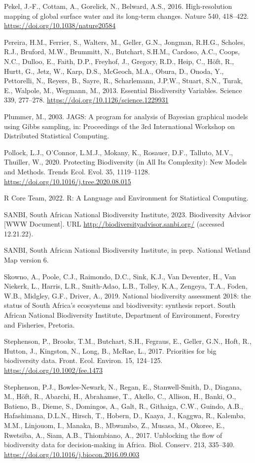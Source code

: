 \documentclass[utf8]{frontiersSCNS}
\begin{document}
Pekel, J.-F., Cottam, A., Gorelick, N., Belward, A.S., 2016.
High-resolution mapping of global surface water and its long-term
changes. Nature 540, 418--422. \url{https://doi.org/10.1038/nature20584}

Pereira, H.M., Ferrier, S., Walters, M., Geller, G.N., Jongman, R.H.G.,
Scholes, R.J., Bruford, M.W., Brummitt, N., Butchart, S.H.M., Cardoso,
A.C., Coops, N.C., Dulloo, E., Faith, D.P., Freyhof, J., Gregory, R.D.,
Heip, C., Höft, R., Hurtt, G., Jetz, W., Karp, D.S., McGeoch, M.A.,
Obura, D., Onoda, Y., Pettorelli, N., Reyers, B., Sayre, R.,
Scharlemann, J.P.W., Stuart, S.N., Turak, E., Walpole, M., Wegmann, M.,
2013. Essential Biodiversity Variables. Science 339, 277--278.
\url{https://doi.org/10.1126/science.1229931}

Plummer, M., 2003. JAGS: A program for analysis of Bayesian graphical
models using Gibbs sampling, in: Proceedings of the 3rd International
Workshop on Distributed Statistical Computing.

Pollock, L.J., O'Connor, L.M.J., Mokany, K., Rosauer, D.F., Talluto,
M.V., Thuiller, W., 2020. Protecting Biodiversity (in All Its
Complexity): New Models and Methods. Trends Ecol. Evol. 35, 1119--1128.
\url{https://doi.org/10.1016/j.tree.2020.08.015}

R Core Team, 2022. R: A Language and Environment for Statistical
Computing.

SANBI, South African National Biodiversity Institute, 2023. Biodiversity
Advisor {[}WWW Document{]}. URL
\url{http://biodiversityadvisor.sanbi.org/} (accessed 12.21.22).

SANBI, South African National Biodiversity Institute, in prep. National
Wetland Map version 6.

Skowno, A., Poole, C.J., Raimondo, D.C., Sink, K.J., Van Deventer, H.,
Van Niekerk, L., Harris, L.R., Smith-Adao, L.B., Tolley, K.A., Zengeya,
T.A., Foden, W.B., Midgley, G.F., Driver, A., 2019. National
biodiversity assessment 2018: the status of South Africa's ecosystems
and biodiversity: synthesis report. South African National Biodiversity
Institute, Department of Environment, Forestry and Fisheries, Pretoria.

Stephenson, P., Brooks, T.M., Butchart, S.H., Fegraus, E., Geller, G.N.,
Hoft, R., Hutton, J., Kingston, N., Long, B., McRae, L., 2017.
Priorities for big biodiversity data. Front. Ecol. Environ. 15,
124--125. \url{https://doi.org/10.1002/fee.1473}

Stephenson, P.J., Bowles-Newark, N., Regan, E., Stanwell-Smith, D.,
Diagana, M., Höft, R., Abarchi, H., Abrahamse, T., Akello, C., Allison,
H., Banki, O., Batieno, B., Dieme, S., Domingos, A., Galt, R., Githaiga,
C.W., Guindo, A.B., Hafashimana, D.L.N., Hirsch, T., Hobern, D., Kaaya,
J., Kaggwa, R., Kalemba, M.M., Linjouom, I., Manaka, B., Mbwambo, Z.,
Musasa, M., Okoree, E., Rwetsiba, A., Siam, A.B., Thiombiano, A., 2017.
Unblocking the flow of biodiversity data for decision-making in Africa.
Biol. Conserv. 213, 335--340.
\url{https://doi.org/10.1016/j.biocon.2016.09.003}
\end{document}
